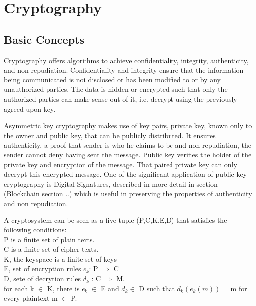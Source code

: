 \section{Cryptography}
\subsection{Basic Concepts}
Cryptography offers algorithms to achieve confidentiality, integrity,
authenticity, and non-repudiation. Confidentiality and integrity ensure that
the information being communicated is not disclosed or has been modified to or
by any unauthorized parties. The data is hidden or encrypted such that only the
authorized parties can make sense out of it, i.e. decrypt using the previously
agreed upon key. 

Asymmetric key cryptography makes use of key pairs, private key, known only to
the owner and public key, that can be publicly distributed. It ensures
authenticity, a proof that sender is who he claims to be and non-repudiation,
the sender cannot deny having sent the message. Public key verifies the holder
of the private key and encryption of the message. That paired private key can
only decrypt this encrypted message. One of the significant application of
public key cryptography is Digital Signatures, described in more detail in
section (Blockchain section ..) which is useful in preserving the properties of
authenticity and non repudiation.

A cryptosystem can be seen as a five tuple (P,C,K,E,D) that satisfies the following
conditions: \\ 
P is a finite set of plain texts.  \\
C is a finite set of cipher texts. \\ 
K, 	the keyspace is a finite set of keys \\
E, set of encryption rules $e_k$: P $\Rightarrow$ C \\
D, sete of decrytion rules $d_k$ : C $\Rightarrow$ M. \\
for each k $\in$ K, there is $e_{k}$ $\in$ E and $d_{k} \in$ D such that 
$d_{k}(e_{k}(m))$ = m for every plaintext m $\in$ P. \\



